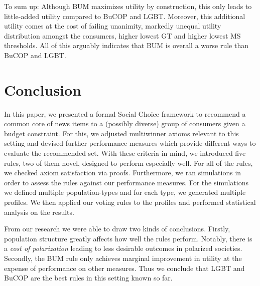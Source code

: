 \documentclass{article}
\begin{document}
To sum up: Although BUM maximizes utility by construction, this only leads to little-added utility compared to BuCOP and LGBT. Moreover, this additional utility comes at the cost of failing unanimity, markedly unequal utility distribution amongst the consumers, higher lowest GT and higher lowest MS thresholds. All of this arguably indicates that BUM is overall a worse rule than BuCOP and LGBT.

\hypertarget{conclusion}{\section{Conclusion}}%

In this paper, we presented a formal Social Choice framework to recommend a common core of news items to a (possibly diverse) group of consumers given a budget constraint. For this, we adjusted multiwinner axioms relevant to this setting and devised further performance measures which provide different ways to evaluate the recommended set. With these criteria in mind, we introduced five rules, two of them novel, designed to perform especially well. For all of the rules, we checked axiom satisfaction via proofs. Furthermore, we ran simulations in order to assess the rules against our performance measures.
For the simulations we defined multiple population-types and for each type, we generated multiple profiles. We then applied our voting rules to the profiles and performed statistical analysis on the results.

From our research we were able to draw two kinds of conclusions. Firstly, population structure greatly affects how well the rules perform. Notably, there is a \emph{cost of polarization} leading to less desirable outcomes in polarized societies. Secondly, the BUM rule only achieves marginal improvement in utility at the expense of performance on other measures. Thus we conclude that LGBT and BuCOP are the best rules in this setting known so far.


\end{document}
